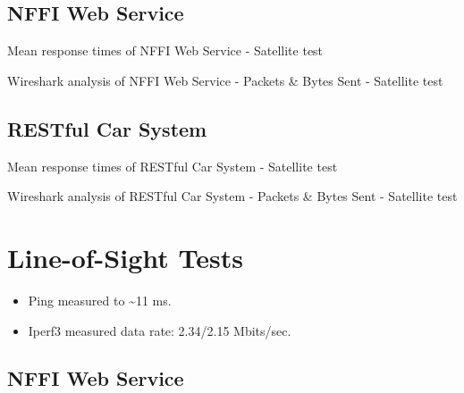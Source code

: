\begin{appendices}
\subsection{NFFI Web Service}

\begin{table}[H]

\caption{Mean response times of NFFI Web Service - Satellite test}
\end{table}

\begin{table}[H]

\caption{Wireshark analysis of NFFI Web Service - Packets \& Bytes Sent - Satellite test}
\end{table}

\subsection{RESTful Car System}

\begin{table}[H]

\caption{Mean response times of RESTful Car System - Satellite test}
\end{table}

\begin{table}[H]

\caption{Wireshark analysis of RESTful Car System - Packets \& Bytes Sent - Satellite test}
\end{table}


\section{Line-of-Sight Tests}

\begin{itemize}
	\item Ping measured to \textasciitilde 11 ms.
	\item Iperf3 measured data rate: 2.34/2.15 Mbits/sec.
\end{itemize}

\subsection{NFFI Web Service}


\end{appendices}
